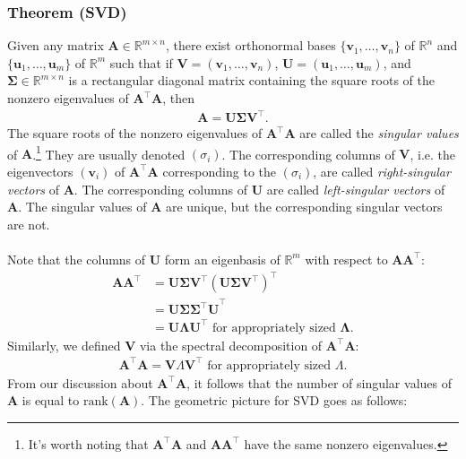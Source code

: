 \documentclass{article}
\begin{document}
\subsubsection*{Theorem (SVD)}
Given any matrix $\textbf{A} \in \mathbb{R}^{m \times n}$, there exist orthonormal bases $\{\textbf{v}_1, \hdots , \textbf{v}_n\}$ of $\mathbb{R}^n$ and $\{\textbf{u}_1, \hdots , \textbf{u}_m\}$ of $\mathbb{R}^m$ such that if $\textbf{V} = (\textbf{v}_1, \hdots , \textbf{v}_n)$, $\textbf{U} = (\textbf{u}_1, \hdots , \textbf{u}_m)$, and $\mathbf{\Sigma} \in \mathbb{R}^{m \times n}$ is a rectangular diagonal matrix containing the square roots of the nonzero eigenvalues of $\textbf{A}^\top\textbf{A}$, then 
\begin{gather*}
    \textbf{A} = \mathbf{U\Sigma V}^\top.
\end{gather*}
The square roots of the nonzero eigenvalues of $\textbf{A}^\top\textbf{A}$ are called the \textit{singular values} of $\textbf{A}$.\footnote{It's worth noting that $\textbf{A}^\top\textbf{A}$ and $\textbf{A}\textbf{A}^\top$ have the same nonzero eigenvalues.} They are usually denoted $(\sigma_i)$. The corresponding columns of $\textbf{V}$, i.e. the eigenvectors $(\textbf{v}_i)$ of $\textbf{A}^\top\textbf{A}$ corresponding to the $(\sigma_i)$, are called \textit{right-singular vectors} of $\textbf{A}$. The corresponding columns of $\textbf{U}$ are called \textit{left-singular vectors} of $\textbf{A}$. The singular values of $\textbf{A}$ are unique, but the corresponding singular vectors are not.
\\ \\
Note that the columns of $\textbf{U}$ form an eigenbasis of $\mathbb{R}^m$ with respect to $\textbf{A}\textbf{A}^\top$:
\begin{align*}
    \textbf{A}\textbf{A}^\top &= \mathbf{U\Sigma V}^\top(\mathbf{U\Sigma V}^\top)^\top \\
    &= \mathbf{U\Sigma\Sigma^{\top}U}^\top \\
    &= \mathbf{U\Lambda U^{\top}} \text{ for appropriately sized } \mathbf{\Lambda}.
\end{align*}
Similarly, we defined $\textbf{V}$ via the spectral decomposition of $\textbf{A}^\top\textbf{A}$:
\begin{align*}
    \textbf{A}^\top\textbf{A} = \textbf{V}\Lambda \textbf{V}^\top \text{ for appropriately sized $\Lambda$.} 
\end{align*}
From our discussion about $\textbf{A}^\top\textbf{A}$, it follows that the number of singular values of $\textbf{A}$ is equal to $\text{rank}(\mathbf{A})$. The geometric picture for SVD goes as follows:
\end{document}

